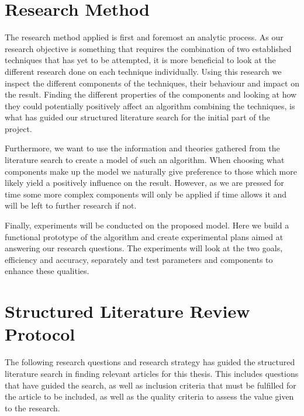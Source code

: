 \section{Research Method}
\label{sec:researchMethod}
The research method applied is first and foremost an analytic process. As our research objective is something that requires the combination of two established techniques that has yet to be attempted, it is more beneficial to look at the different research done on each technique individually. Using this research we inspect the different components of the techniques, their behaviour and impact on the result. Finding the different properties of the components and looking at how they could potentially positively affect an algorithm combining the techniques, is what has guided our structured literature search for the initial part of the project. 

Furthermore, we want to use the information and theories gathered from the literature search to create a model of such an algorithm. When choosing what components make up the model we naturally give preference to those which more likely yield a positively influence on the result. However, as we are pressed for time some more complex components will only be applied if time allows it and will be left to further research if not.

Finally, experiments will be conducted on the proposed model. Here we build a functional prototype of the algorithm and create experimental plans aimed at answering our research questions. The experiments will look at the two goals, efficiency and accuracy, separately and test parameters and components to enhance these qualities. 



\section{Structured Literature Review Protocol}

The following research questions and research strategy has guided the structured literature search in finding relevant articles for this thesis. This includes questions that have guided the search, as well as inclusion criteria that must be fulfilled for the article to be included, as well as the quality criteria to assess the value given to the research.


